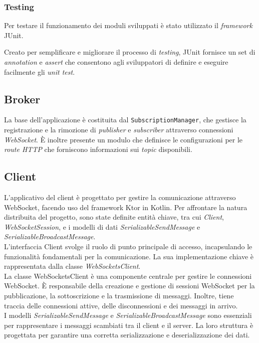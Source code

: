 \subsubsection{Testing}

Per testare il funzionamento dei moduli sviluppati è stato utilizzato il \textit{framework} JUnit\cite{junit}.

Creato per semplificare e migliorare il processo di \textit{testing}, JUnit fornisce un set di \textit{annotation} e \textit{assert} che consentono agli sviluppatori di definire e eseguire facilmente gli \textit{unit test}.

\subsection{Broker}
La base dell'applicazione è costituita dal \texttt{SubscriptionManager}, che gestisce la registrazione e la rimozione di \textit{publisher} e \textit{subscriber} attraverso connessioni \textit{WebSocket}. È inoltre presente un modulo che definisce le configurazioni per le \textit{route HTTP} che forniscono informazioni sui \textit{topic} disponibili.

\subsection{Client}
L'applicativo del client è progettato per gestire la comunicazione attraverso WebSocket,
facendo uso del framework Ktor in Kotlin. Per affrontare la natura distribuita del progetto,
sono state definite entità chiave, tra cui \textit{Client}, \textit{WebSocketSession}, e i modelli di dati
\textit{SerializableSendMessage} e \textit{SerializableBroadcastMessage}. \\

L'interfaccia Client svolge il ruolo di punto principale di accesso, incapsulando le funzionalità fondamentali per la
comunicazione. La sua implementazione chiave è rappresentata dalla classe \textit{WebSocketsClient}.\\

La classe WebSocketsClient è una componente centrale per gestire le connessioni WebSocket.
È responsabile della creazione e gestione di sessioni WebSocket per la pubblicazione,
la sottoscrizione e la trasmissione di messaggi. Inoltre, tiene traccia delle connessioni attive, delle disconnessioni e dei messaggi in arrivo.\\

I modelli \textit{SerializableSendMessage} e \textit{SerializableBroadcastMessage} sono essenziali per rappresentare i messaggi scambiati tra il client e
il server. La loro struttura è progettata per garantire una corretta serializzazione e deserializzazione dei dati. \\

